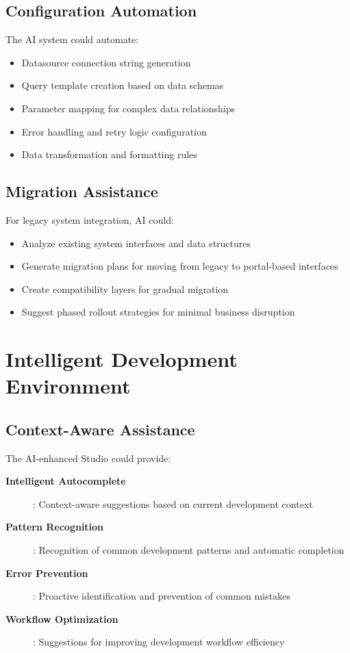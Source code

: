 \subsection{Configuration Automation}

The AI system could automate:
\begin{itemize}
\item Datasource connection string generation
\item Query template creation based on data schemas
\item Parameter mapping for complex data relationships
\item Error handling and retry logic configuration
\item Data transformation and formatting rules
\end{itemize}

\subsection{Migration Assistance}

For legacy system integration, AI could:
\begin{itemize}
\item Analyze existing system interfaces and data structures
\item Generate migration plans for moving from legacy to portal-based interfaces
\item Create compatibility layers for gradual migration
\item Suggest phased rollout strategies for minimal business disruption
\end{itemize}

\section{Intelligent Development Environment}
\label{sec:intelligent-development}

\subsection{Context-Aware Assistance}

The AI-enhanced Studio could provide:

\begin{description}
\item[\textbf{Intelligent Autocomplete}]: Context-aware suggestions based on current development context
\item[\textbf{Pattern Recognition}]: Recognition of common development patterns and automatic completion
\item[\textbf{Error Prevention}]: Proactive identification and prevention of common mistakes
\item[\textbf{Workflow Optimization}]: Suggestions for improving development workflow efficiency
\end{description}

